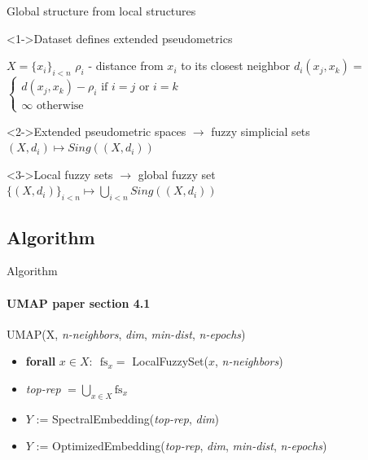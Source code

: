 \documentclass[unknownkeysallowed]{beamer}
\begin{document}
\begin{frame}{Global structure from local structures}

    \begin{block}<1->{Dataset defines extended pseudometrics}

    $X = \{x_i\}_{i < n}$
    \break
    $\rho_i$ - distance from $x_i$ to its closest neighbor
    \break
    $d_i(x_j, x_k) = $
    $
    \begin{cases*}
        d(x_j, x_k) - \rho_i \textrm{  if } i = j \textrm{ or } i = k \\
        \infty \textrm{                 otherwise}
    \end{cases*}
    $
    
    \end{block}

    \begin{block}<2->{Extended pseudometric spaces $\to$ fuzzy simplicial sets}
	$(X, d_i) \mapsto Sing((X, d_i))$
    \end{block}

    \begin{block}<3->{Local fuzzy sets $\to$ global fuzzy set}
	$\{(X, d_i)\}_{i < n} \mapsto \bigcup_{i < n} Sing((X, d_i))$ 
    \end{block}


\end{frame}

\subsection{Algorithm}

\begin{frame}{Algorithm}
\framesubtitle{UMAP paper section 4.1}


    \begin{block}{UMAP(X, \textit{n-neighbors}, \textit{dim}, \textit{min-dist}, \textit{n-epochs})}
    \begin{itemize}
        \item \textbf{forall} $x \in X$: $\textrm{ fs}_x =$ LocalFuzzySet($x$, \textit{n-neighbors})
        \item \textit{top-rep} $= \bigcup_{x \in X} \textrm{fs}_x$
        \item $Y$ := SpectralEmbedding(\textit{top-rep}, \textit{dim})
        \item $Y$ := OptimizedEmbedding(\textit{top-rep}, \textit{dim}, \textit{min-dist}, \textit{n-epochs})
    \end{itemize}
    \end{block}
\end{frame}
\end{document}
